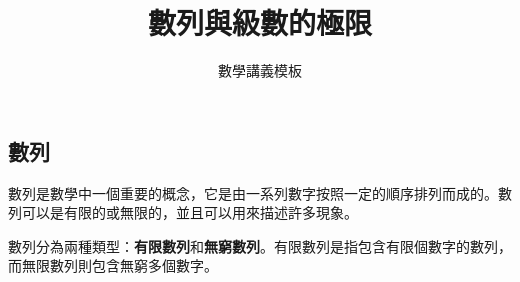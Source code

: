 \documentclass[12pt]{article}
\title{\textbf{數列與級數的極限}}
\author{數學講義模板}
\date{}
\begin{document}
\begin{tcolorbox}[colframe=black!60!blue, colback=blue!5!white, arc=4pt, boxrule=1pt]
\section{數列}


數列是數學中一個重要的概念，它是由一系列數字按照一定的順序排列而成的。數列可以是有限的或無限的，並且可以用來描述許多現象。

數列分為兩種類型：\textbf{有限數列}和\textbf{無窮數列}。有限數列是指包含有限個數字的數列，而無限數列則包含無窮多個數字。

\end{tcolorbox}
\end{document}
